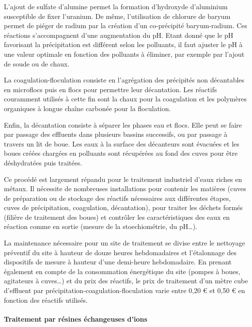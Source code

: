 \documentclass{article}
\begin{document}
L’ajout de sulfate d’alumine permet la formation d’hydroxyde d’aluminium susceptible de fixer l’uranium. De même, l’utilisation de chlorure de baryum permet de piéger de radium par la création d’un co-précipité baryum-radium. Ces réactions s’accompagnent d’une augmentation du pH. Etant donné que le pH favorisant la précipitation est différent selon les polluants, il faut ajuster le pH à une valeur optimale en fonction des polluants à éliminer, par exemple par l’ajout de soude ou de chaux.  

La coagulation-floculation consiste en l’agrégation des précipités non décantables en microflocs puis en flocs  pour permettre leur décantation. Les réactifs couramment utilisés à cette fin sont la chaux pour la coagulation et les polymères organiques à longue chaîne carbonée pour la floculation. 

Enfin, la décantation consiste à séparer les phases eau et flocs. Elle peut se faire par passage des effluents dans plusieurs bassins successifs, ou par passage à travers un lit de boue. Les eaux à la surface des décanteurs sont évacuées et les boues créées chargées en polluants sont récupérées au fond des cuves pour être déshydratées puis traitées.

Ce procédé est largement répandu pour le traitement industriel d’eaux riches en métaux. Il nécessite de nombreuses installations pour contenir les matières (cuves de préparation ou de stockage des réactifs nécessaires aux différentes étapes, cuves de précipitation, coagulation, décantation), pour traiter les déchets formés (filière de traitement des boues) et contrôler les caractéristiques des eaux en réaction comme en sortie (mesure de la stoechiométrie, du pH…). 

La maintenance nécessaire pour un site de traitement se divise entre le nettoyage préventif du site à hauteur de douze heures hebdomadaires et l’étalonnage des dispositifs de mesure à hauteur d’une demi-heure hebdomadaire. En prenant également en compte de la consommation énergétique du site (pompes à boues, agitateurs à cuves…) et du prix des réactifs, le prix de traitement d’un mètre cube d’effluent par précipitation-coagulation-floculation varie entre 0,20 € et 0,50 € en fonction des réactifs utilisés.

\paragraph{Traitement par résines échangeuses d’ions} \hspace{1 em}
\end{document}
